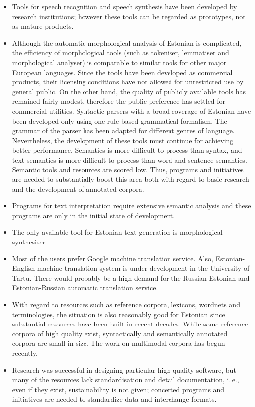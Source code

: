 \begin{multicols}{2}
\begin{itemize}
\item Tools for speech recognition and speech synthesis have been developed by research institutions; however these tools can be regarded as prototypes, not as mature products.  
\item Although the automatic morphological analysis of Estonian is complicated, the efficiency of morphological tools (such as tokeniser, lemmatiser and morphological analyser) is comparable to similar tools for other major European languages. Since the tools have been developed as commercial products, their licensing conditions have not allowed for unrestricted use by general public. On the other hand, the quality of publicly available tools has remained fairly modest, therefore the public preference has settled for commercial utilities.  Syntactic parsers with a broad coverage of Estonian have been developed only using one rule-based grammatical formalism. The grammar of the parser has been adapted for different genres of language. Nevertheless, the development of these tools must continue for achieving better performance.  Semantics is more difficult to process than syntax, and text semantics is more difficult to process than word and sentence semantics.  Semantic tools and resources are scored low.  Thus, programs and initiatives are needed to substantially boost this area both with regard to basic research and the development of annotated corpora.  
\columnbreak
\item Programs for text interpretation require extensive semantic analysis and these programs are only in the initial state of development.  
\item The only available tool for Estonian text generation is morphological synthesiser.  
\item Most of the users prefer Google machine translation service. Also, Estonian-English machine translation system is under development in the University of Tartu. There would probably be a high demand for the Russian-Estonian and Estonian-Russian automatic translation service.  
\item With regard to resources such as reference corpora, lexicons, wordnets and terminologies, the situation is also reasonably good for Estonian since substantial resources have been built in recent decades. While some reference corpora of high quality exist, syntactically and semantically annotated corpora are small in size. The work on multimodal corpora has begun recently.  
\item Research was successful in designing particular high quality software, but many of the resources lack standardisation and detail documentation, i.\,e., even if they exist, sustainability is not given; concerted programs and initiatives are needed to standardize data and interchange formats.
\end{itemize}


\end{multicols}
